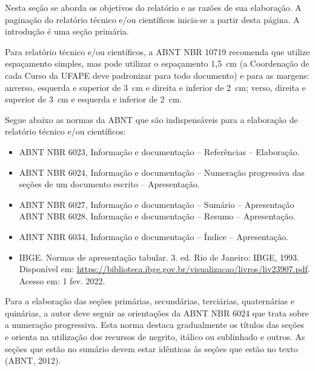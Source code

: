 Nesta seção se aborda os objetivos do relatório e as razões de sua elaboração.
A paginação do relatório técnico e/ou científicos inicia-se a partir desta
página. A introdução é uma seção primária.

Para relatório técnico e/ou científicos, a ABNT NBR 10719 recomenda que
utilize espaçamento simples, mas pode utilizar o espaçamento 1,5~cm (a
Coordenação de cada Curso da UFAPE deve padronizar para todo documento) e para
as margens: anverso, esquerda e superior de 3~cm e direita e inferior de 2~cm;
verso, direita e superior de 3~cm e esquerda e inferior de 2~cm.

Segue abaixo as normas da ABNT que são indispensáveis para a elaboração de
relatório técnico e/ou científicos:

\begin{itemize}
  \item ABNT NBR 6023, Informação e documentação -- Referências -- Elaboração.
  \item ABNT NBR 6024, Informação e documentação -- Numeração progressiva das
        seções de um documento escrito -- Apresentação.
  \item ABNT NBR 6027, Informação e documentação -- Sumário -- Apresentação ABNT
        NBR 6028, Informação e documentação -- Resumo -- Apresentação.
  \item ABNT NBR 6034, Informação e documentação -- Índice -- Apresentação.
  \item IBGE. Normas de apresentação tabular. 3. ed. Rio de Janeiro: IBGE, 1993.
        Disponível em:
        \url{https://biblioteca.ibge.gov.br/visualizacao/livros/liv23907.pdf}.
        Acesso em: 1 fev. 2022.
\end{itemize}

Para a elaboração das seções primárias, secundárias, terciárias, quaternárias
e quinárias, a autor deve seguir as orientações da ABNT NBR 6024 que trata
sobre a numeração progressiva. Esta norma destaca gradualmente os títulos das
seções e orienta na utilização dos recursos de negrito, itálico ou sublinhado
e outros. As seções que estão no sumário devem estar idênticas às seções que
estão no texto (ABNT, 2012).

\textopadrao

\textopadrao
